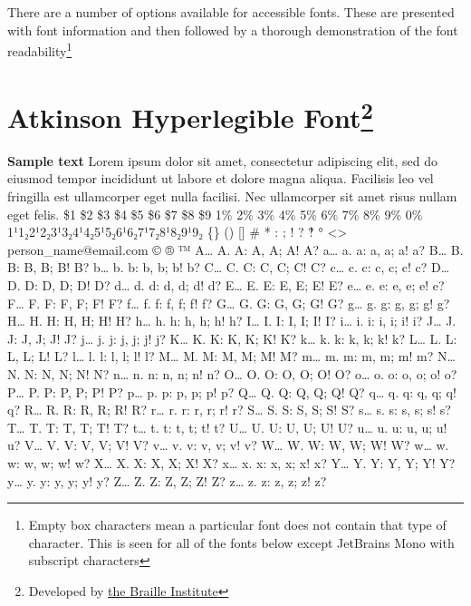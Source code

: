 There are a number of options available for accessible fonts. These are presented with font information and then followed by a thorough demonstration of the font readability\footnote{\raggedright Empty box characters mean a particular font does not contain that type of character. This is seen for all of the fonts below except JetBrains Mono with subscript characters} 
\pagebreak
\hypertarget{trouble6}{}\section[Atkinson Hyperlegible Font]{Atkinson Hyperlegible Font\footnote{\raggedright Developed by \href{https://brailleinstitute.org/freefont}{the Braille Institute}}}\label{trouble6}
\textbf{Sample text}
 \break Lorem ipsum dolor sit amet, consectetur adipiscing elit, sed do eiusmod tempor incididunt ut labore et dolore magna aliqua. Facilisis leo vel fringilla est ullamcorper eget nulla facilisi. Nec ullamcorper sit amet risus nullam eget felis.
\break \$1 \$2 \$3 \$4 \$5 \$6 \$7 \$8 \$9 1\% 2\% 3\% 4\% 5\% 6\% 7\% 8\% 9\% 0\%
\break 1¹1₂2¹2₂3¹3₂4¹4₂5¹5₂6¹6₂7¹7₂8¹8₂9¹9₂
\break \{\} () [] \# * : ; ! ? ‽ ° <> person\_name@email.com © ® ™
\break A… A. A: A, A; A! A? a… a. a: a, a; a! a?
\break B… B. B: B, B; B! B? b… b. b: b, b; b! b?
\break C… C. C: C, C; C! C? c… c. c: c, c; c! c?
\break D… D. D: D, D; D! D? d… d. d: d, d; d! d?
\break E… E. E: E, E; E! E? e… e. e: e, e; e! e?
\break F… F. F: F, F; F! F? f… f. f: f, f; f! f?
\break G… G. G: G, G; G! G? g… g. g: g, g; g! g?
\break H… H. H: H, H; H! H? h… h. h: h, h; h! h?
\break I… I. I: I, I; I! I? i… i. i: i, i; i! i?
\break J… J. J: J, J; J! J? j… j. j: j, j; j! j?
\break K… K. K: K, K; K! K? k… k. k: k, k; k! k?
\break L… L. L: L, L; L! L? l… l. l: l, l; l! l?
\break M… M. M: M, M; M! M? m… m. m: m, m; m! m?
\break N… N. N: N, N; N! N? n… n. n: n, n; n! n?
\break O… O. O: O, O; O! O? o… o. o: o, o; o! o?
\break P… P. P: P, P; P! P? p… p. p: p, p; p! p?
\break Q… Q. Q: Q, Q; Q! Q? q… q. q: q, q; q! q?
\break R… R. R: R, R; R! R? r… r. r: r, r; r! r?
\break S… S. S: S, S; S! S? s… s. s: s, s; s! s?
\break T… T. T: T, T; T! T? t… t. t: t, t; t! t?
\break U… U. U: U, U; U! U? u… u. u: u, u; u! u?
\break V… V. V: V, V; V! V? v… v. v: v, v; v! v?
\break W… W. W: W, W; W! W? w… w. w: w, w; w! w?
\break X… X. X: X, X; X! X? x… x. x: x, x; x! x?
\break Y… Y. Y: Y, Y; Y! Y? y… y. y: y, y; y! y?
\break Z… Z. Z: Z, Z; Z! Z? z… z. z: z, z; z! z?

